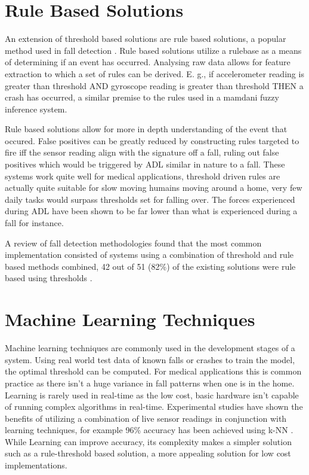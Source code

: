 \section{Rule Based Solutions}
An extension of threshold based solutions are rule based solutions, a popular method used in fall detection \cite {commonSolutions} .  Rule based solutions utilize a rulebase as a means of determining if an event has occurred. Analysing raw data allows for feature extraction to which a set of rules can be derived. E. g., if accelerometer reading is greater than threshold AND gyroscope reading is greater than threshold THEN a crash has occurred, a similar premise to the rules used in a mamdani fuzzy inference system.

Rule based solutions allow for more in depth understanding of the event that occured. False positives can be greatly reduced by constructing rules targeted to fire iff the sensor reading align with the signature off a fall, ruling out false positives which would be triggered by ADL similar in nature to a fall. These systems work quite well for medical applications, threshold driven rules are actually quite suitable for slow moving humains moving around a home, very few daily tasks would surpass thresholds set for falling over. The forces experienced during ADL have been shown to be far lower than what is experienced during a fall for instance\cite{smart}.

A review of fall detection methodologies found that the most common implementation consisted of  systems using a combination of threshold and rule based methods combined, 42 out of 51 (82\%) of the existing solutions were rule based using thresholds \cite {commonSolutions}. 



\section {Machine Learning Techniques}
Machine learning techniques are commonly used in the development stages of a system. Using real world test data of known falls or crashes to train the model, the optimal threshold can be computed. For medical applications this is common practice as there isn't a huge variance in fall patterns when one is in the home.  Learning is rarely used in real-time as the low cost, basic hardware isn't capable of running complex algorithms in real-time. Experimental studies have shown the benefits of utilizing a combination of live sensor readings in conjunction with learning techniques, for example 96\% accuracy has been achieved using k-NN \cite{mls} . While Learning can improve accuracy, its complexity makes a simpler solution such as a rule-threshold based solution, a more appealing solution for low cost implementations.


